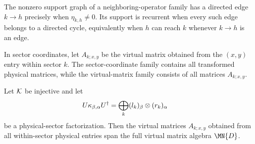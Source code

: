 \begin{definition}%
    \label{def:mpdo_eta_recurrent_support}
    \leanok
    The nonzero support graph of a neighboring-operator family has a directed
    edge $k\to h$ precisely when $\eta_{k,h}\ne0$. Its support is recurrent
    when every such edge belongs to a directed cycle, equivalently when $h$
    can reach $k$ whenever $k\to h$ is an edge.
\end{definition}

\begin{definition}%
    \label{def:mpdo_sector_virtual_matrix_families}
    \leanok
    In sector coordinates, let $A_{k;x,y}$ be the virtual matrix obtained
    from the $(x,y)$ entry within sector $k$. The sector-coordinate family
    contains all transformed physical matrices, while the virtual-matrix
    family consists of all matrices $A_{k;x,y}$.
\end{definition}

\begin{lemma}%
    \label{thm:mpdo_sector_virtual_matrix_spanning}
    \leanok
    Let ${\cal K}$ be injective and let
    \begin{align}
        U\kappa_{\beta,\alpha}U^\dagger
         & =\bigoplus_k(l_k)_\beta\otimes(r_k)_\alpha
        \notag
    \end{align}
    be a physical-sector factorization. Then the virtual matrices
    $A_{k;x,y}$ obtained from all within-sector physical entries span the full
    virtual matrix algebra $\MN{D}$.
\end{lemma}

